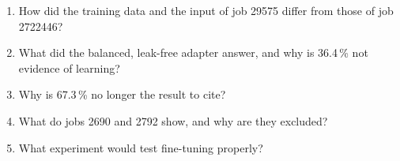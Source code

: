 \begin{selfcheck}
\begin{enumerate}
  \item How did the training data and the input of job 29575 differ from those of job 2722446?
  \item What did the balanced, leak-free adapter answer, and why is 36.4\,\% not evidence of learning?
  \item Why is 67.3\,\% no longer the result to cite?
  \item What do jobs 2690 and 2792 show, and why are they excluded?
  \item What experiment would test fine-tuning properly?
\end{enumerate}
\end{selfcheck}

